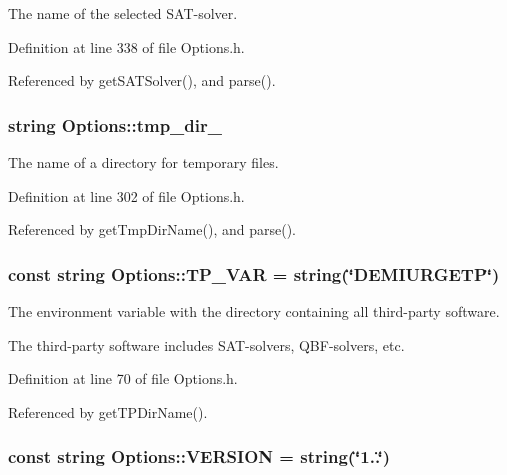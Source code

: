 The name of the selected S\-A\-T-\/solver. 



Definition at line 338 of file Options.\-h.



Referenced by get\-S\-A\-T\-Solver(), and parse().

\hypertarget{classOptions_a9428fdd0bd5f4f256c18a4d7db9c0647}{
\subsubsection[{tmp\-\_\-dir\-\_\-}]{\setlength{\rightskip}{0pt plus 5cm}string Options\-::tmp\-\_\-dir\-\_\-\hspace{0.3cm}{\ttfamily [protected]}}}\label{classOptions_a9428fdd0bd5f4f256c18a4d7db9c0647}


The name of a directory for temporary files. 



Definition at line 302 of file Options.\-h.



Referenced by get\-Tmp\-Dir\-Name(), and parse().

\hypertarget{classOptions_ad3285bfd4c5984cd79988ddce49ee507}{
\subsubsection[{T\-P\-\_\-\-V\-A\-R}]{\setlength{\rightskip}{0pt plus 5cm}const string Options\-::\-T\-P\-\_\-\-V\-A\-R = string(\char`\"{}D\-E\-M\-I\-U\-R\-G\-E\-T\-P\char`\"{})\hspace{0.3cm}{\ttfamily [static]}}}\label{classOptions_ad3285bfd4c5984cd79988ddce49ee507}


The environment variable with the directory containing all third-\/party software. 

The third-\/party software includes S\-A\-T-\/solvers, Q\-B\-F-\/solvers, etc. 

Definition at line 70 of file Options.\-h.



Referenced by get\-T\-P\-Dir\-Name().

\hypertarget{classOptions_ab8a901c1ad7d3ab672db099fb4c0b197}{
\subsubsection[{V\-E\-R\-S\-I\-O\-N}]{\setlength{\rightskip}{0pt plus 5cm}const string Options\-::\-V\-E\-R\-S\-I\-O\-N = string(\char`\"{}1..\char`\"{})\hspace{0.3cm}{\ttfamily [static]}}}\label{classOptions_ab8a901c1ad7d3ab672db099fb4c0b197}


